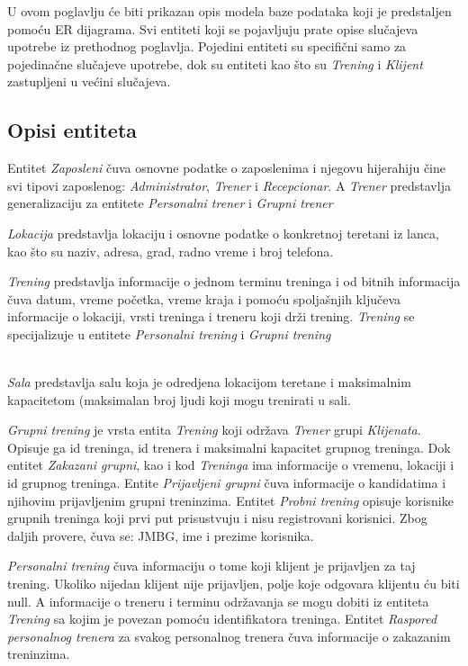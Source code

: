 \documentclass[../main.tex]{subfiles}
\begin{document}
U ovom poglavlju će biti prikazan opis modela baze podataka koji je predstaljen pomoću ER dijagrama. Svi entiteti koji se pojavljuju prate opise slučajeva upotrebe iz prethodnog poglavlja. Pojedini entiteti su specifični samo za pojedinačne slučajeve upotrebe, dok su entiteti kao što su \textit{Trening} i \textit{Klijent} zastupljeni u većini slučajeva. 

\subsection{Opisi entiteta}

Entitet \textit{Zaposleni} čuva osnovne podatke o zaposlenima i njegovu hijerahiju čine svi tipovi zaposlenog: \textit{Administrator}, \textit{Trener} i \textit{Recepcionar}. A \textit{Trener} predstavlja generalizaciju za entitete \textit{Personalni trener} i \textit{Grupni trener}

\textit{Lokacija} predstavlja lokaciju i osnovne podatke o konkretnoj teretani iz lanca, kao što su naziv, adresa, grad, radno vreme i broj telefona.

\textit{Trening} predstavlja informacije o jednom terminu treninga i od bitnih informacija čuva datum, vreme početka, vreme kraja i pomoću spoljašnjih ključeva informacije o lokaciji, vrsti treninga i treneru koji drži trening. \textit{Trening} se specijalizuje u entitete \textit{Personalni trening} i \textit{Grupni trening}

\\
\textit{Sala} predstavlja salu koja je odredjena lokacijom teretane i maksimalnim kapacitetom (maksimalan broj ljudi koji mogu trenirati u sali.

\textit{Grupni trening} je vrsta entita \textit{Trening} koji održava \textit{Trener} grupi \textit{Klijenata}. Opisuje ga id treninga, id trenera i maksimalni kapacitet grupnog treninga. Dok entitet \textit{Zakazani grupni}, kao i kod \textit{Treninga} ima informacije o vremenu, lokaciji i id grupnog treninga.
Entite \textit{Prijavljeni grupni} čuva informacije o kandidatima i njihovim prijavljenim grupni treninzima.
Entitet \textit{Probni trening} opisuje korisnike grupnih treninga koji prvi put prisustvuju i nisu registrovani korisnici. Zbog daljih provere, čuva se: JMBG, ime i prezime korisnika.

\textit{Personalni trening} čuva informaciju o tome koji klijent je prijavljen za taj trening. Ukoliko nijedan klijent nije prijavljen, polje koje odgovara klijentu ću biti null. A informacije o treneru i terminu održavanja se mogu dobiti iz entiteta \textit{Trening} sa kojim je povezan pomoću identifikatora treninga. Entitet \textit{Raspored personalnog trenera} za svakog personalnog trenera čuva informacije o zakazanim treninzima.
\end{document}
